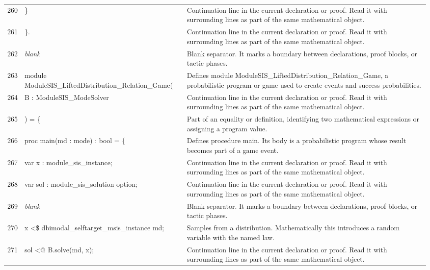 \documentclass[10pt]{article}
\begin{document}
\begin{longtable}{r L{0.53\textwidth} L{0.37\textwidth}}
260 & {\ttfamily\scriptsize   \}} & Continuation line in the current declaration or proof.  Read it with surrounding lines as part of the same mathematical object. \\
261 & {\ttfamily\scriptsize \}.} & Continuation line in the current declaration or proof.  Read it with surrounding lines as part of the same mathematical object. \\
262 & {\ttfamily\scriptsize \emph{blank}} & Blank separator.  It marks a boundary between declarations, proof blocks, or tactic phases. \\
263 & {\ttfamily\scriptsize module ModuleSIS\_LiftedDistribution\_Relation\_Game(} & Defines module ModuleSIS\_LiftedDistribution\_Relation\_Game, a probabilistic program or game used to create events and success probabilities. \\
264 & {\ttfamily\scriptsize   B : ModuleSIS\_ModeSolver} & Continuation line in the current declaration or proof.  Read it with surrounding lines as part of the same mathematical object. \\
265 & {\ttfamily\scriptsize ) = \{} & Part of an equality or definition, identifying two mathematical expressions or assigning a program value. \\
266 & {\ttfamily\scriptsize   proc main(md : mode) : bool = \{} & Defines procedure main.  Its body is a probabilistic program whose result becomes part of a game event. \\
267 & {\ttfamily\scriptsize     var x : module\_sis\_instance;} & Continuation line in the current declaration or proof.  Read it with surrounding lines as part of the same mathematical object. \\
268 & {\ttfamily\scriptsize     var sol : module\_sis\_solution option;} & Continuation line in the current declaration or proof.  Read it with surrounding lines as part of the same mathematical object. \\
269 & {\ttfamily\scriptsize \emph{blank}} & Blank separator.  It marks a boundary between declarations, proof blocks, or tactic phases. \\
270 & {\ttfamily\scriptsize     x <\$ dbimodal\_selftarget\_msis\_instance md;} & Samples from a distribution.  Mathematically this introduces a random variable with the named law. \\
271 & {\ttfamily\scriptsize     sol <@ B.solve(md, x);} & Continuation line in the current declaration or proof.  Read it with surrounding lines as part of the same mathematical object. \\

\end{longtable}
\end{document}
